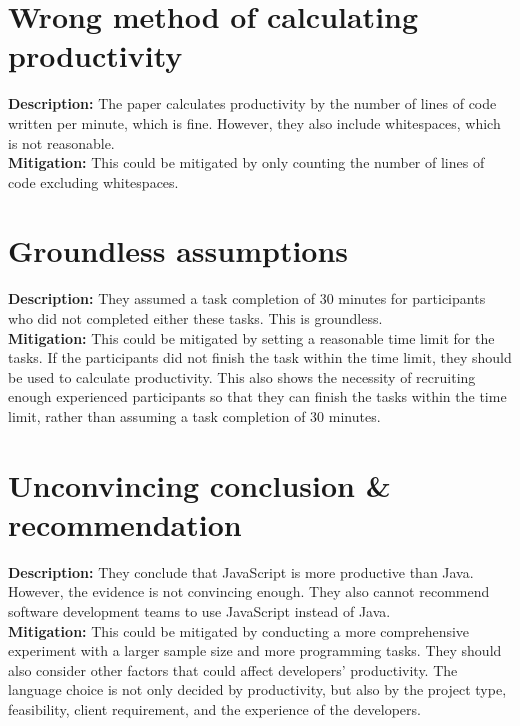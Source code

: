 \documentclass{article}
\begin{document}
\section{Wrong method of calculating productivity}
\textbf{Description:} The paper calculates productivity by the number of lines of code written per minute, which is fine. However, they also include whitespaces, which is not reasonable.\\
\textbf{Mitigation:} This could be mitigated by only counting the number of lines of code excluding whitespaces.

\section{Groundless assumptions}
\textbf{Description:} They assumed a task completion of 30 minutes for participants who did not completed either these tasks. This is groundless.\\
\textbf{Mitigation:} This could be mitigated by setting a reasonable time limit for the tasks. If the participants did not finish the task within the time limit, they should be used to calculate productivity. This also shows the necessity of recruiting enough experienced participants so that they can finish the tasks within the time limit, rather than assuming a task completion of 30 minutes.

\section{Unconvincing conclusion \& recommendation}
\textbf{Description:} They conclude that JavaScript is more productive than Java. However, the evidence is not convincing enough. They also cannot recommend software development teams to use JavaScript instead of Java.\\
\textbf{Mitigation:} This could be mitigated by conducting a more comprehensive experiment with a larger sample size and more programming tasks. They should also consider other factors that could affect developers' productivity. The language choice is not only decided by productivity, but also by the project type, feasibility, client requirement, and the experience of the developers.
\end{document}
